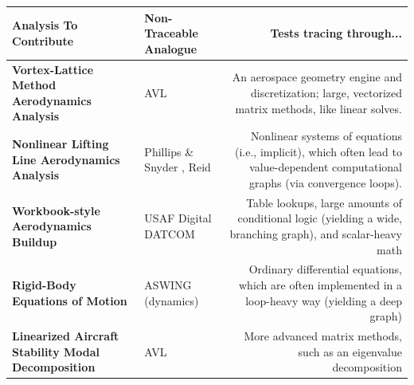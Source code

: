 \documentclass[12pt,vi,oneside]{report}
\begin{document}
\begin{table}[H]
\begin{adjustbox}{width=\textwidth}
            \begin{tabularx}{1.2\textwidth}{M E D}
                \toprule
                \textbf{Analysis To Contribute}                            & \textbf{Non-Traceable Analogue}                                               & \textbf{Tests tracing through...}                                                                                                  \\ \toprule
                \textbf{Vortex-Lattice Method Aerodynamics Analysis}       & AVL \cite{avl}                                                                & An aerospace geometry engine and discretization; large, vectorized matrix methods, like linear solves.                             \\ \midrule
                \textbf{Nonlinear Lifting Line Aerodynamics Analysis}      & Phillips \& Snyder \cite{phillips_modern_2000}, Reid \cite{reid_general_2020} & Nonlinear systems of equations (i.e., implicit), which often lead to value-dependent computational graphs (via convergence loops). \\ \midrule
                \textbf{Workbook-style Aerodynamics Buildup}               & USAF Digital DATCOM \cite{datcom}                                             & Table lookups, large amounts of conditional logic (yielding a wide, branching graph), and scalar-heavy math                        \\ \midrule
                \textbf{Rigid-Body Equations of Motion}                    & ASWING (dynamics) \cite{aswing}                                               & Ordinary differential equations, which are often implemented in a loop-heavy way (yielding a deep graph)                           \\ \midrule
                \textbf{Linearized Aircraft Stability Modal Decomposition} & AVL \cite{avl}                                                                & More advanced matrix methods, such as an eigenvalue decomposition                                                                  \\
                \bottomrule
            \end{tabularx}

        \end{adjustbox}
    \end{table}
\end{document}

